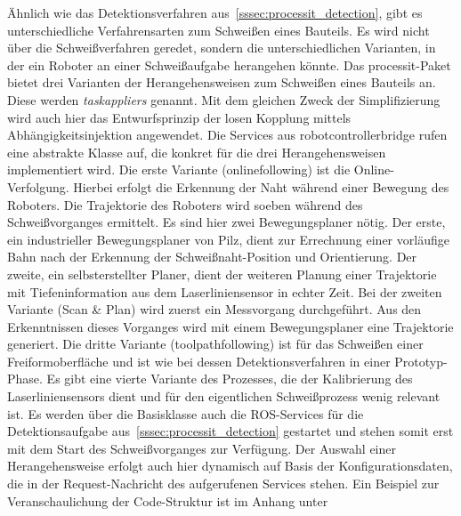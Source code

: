 Ähnlich wie das Detektionsverfahren aus~\ref{sssec:processit_detection}, gibt es unterschiedliche Verfahrensarten zum Schweißen eines Bauteils. Es wird nicht über die Schweißverfahren geredet, sondern die unterschiedlichen Varianten, in der ein Roboter an einer Schweißaufgabe herangehen könnte. Das processit-Paket bietet drei Varianten der Herangehensweisen zum Schweißen eines Bauteils an. Diese werden \emph{task\textunderscore appliers} genannt. Mit dem gleichen Zweck der Simplifizierung wird auch hier das Entwurfsprinzip der losen Kopplung mittels Abhängigkeitsinjektion angewendet. Die Services aus robot\textunderscore controller\textunderscore bridge rufen eine abstrakte Klasse auf, die konkret für die drei Herangehensweisen implementiert wird. Die erste Variante (online\textunderscore following) ist die Online-Verfolgung. Hierbei erfolgt die Erkennung der Naht während einer Bewegung des Roboters. Die Trajektorie des Roboters wird soeben während des Schweißvorganges ermittelt. Es sind hier zwei Bewegungsplaner nötig. Der erste, ein industrieller Bewegungsplaner von Pilz, dient zur Errechnung einer vorläufige Bahn nach der Erkennung der Schweißnaht-Position und Orientierung. Der zweite, ein selbsterstellter Planer, dient der weiteren Planung einer Trajektorie mit Tiefeninformation aus dem Laserliniensensor in echter Zeit. Bei der zweiten Variante (Scan \& Plan) wird zuerst ein Messvorgang durchgeführt. Aus den Erkenntnissen dieses Vorganges wird mit einem Bewegungsplaner eine Trajektorie generiert. Die dritte Variante (toolpath\textunderscore following) ist für das Schweißen einer Freiformoberfläche und ist wie bei dessen Detektionsverfahren in einer Prototyp-Phase. Es gibt eine vierte Variante des Prozesses, die der Kalibrierung des Laserliniensensors dient und für den eigentlichen Schweißprozess wenig relevant ist. Es werden über die Basisklasse auch die ROS-Services für die Detektionsaufgabe aus~\ref{sssec:processit_detection} gestartet und stehen somit erst mit dem Start des Schweißvorganges zur Verfügung. Der Auswahl einer Herangehensweise erfolgt auch hier dynamisch auf Basis der Konfigurationsdaten, die in der Request-Nachricht des aufgerufenen Services stehen. Ein Beispiel zur Veranschaulichung der Code-Struktur ist im Anhang unter %

